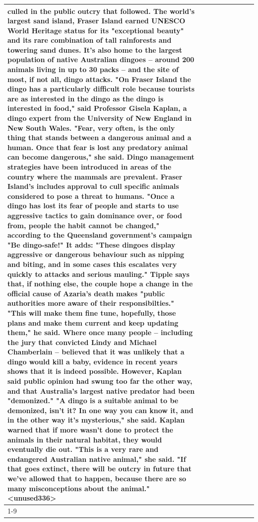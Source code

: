\begin{table}[H]
\begin{tabular}{lllrlllll}
culled in the public outcry that followed. The world's largest sand island, Fraser Island earned UNESCO World Heritage status for its "exceptional beauty" and its rare combination of tall rainforests and towering sand dunes. It's also home to the largest population of native Australian dingoes -- around 200 animals living in up to 30 packs -- and the site of most, if not all, dingo attacks. "On Fraser Island the dingo has a particularly difficult role because tourists are as interested in the dingo as the dingo is interested in food," said Professor Gisela Kaplan, a dingo expert from the University of New England in New South Wales. "Fear, very often, is the only thing that stands between a dangerous animal and a human. Once that fear is lost any predatory animal can become dangerous," she said. Dingo management strategies have been introduced in areas of the country where the mammals are prevalent. Fraser Island's includes approval to cull specific animals considered to pose a threat to humans. "Once a dingo has lost its fear of people and starts to use aggressive tactics to gain dominance over, or food from, people the habit cannot be changed," according to the Queensland government's campaign "Be dingo-safe!" It adds: "These dingoes display aggressive or dangerous behaviour such as nipping and biting, and in some cases this escalates very quickly to attacks and serious mauling." Tipple says that, if nothing else, the couple hope a change in the official cause of Azaria's death makes "public authorities more aware of their responsibilties." "This will make them fine tune, hopefully, those plans and make them current and keep updating them," he said. Where once many people -- including the jury that convicted Lindy and Michael Chamberlain -- believed that it was unlikely that a dingo would kill a baby, evidence in recent years shows that it is indeed possible. However, Kaplan said public opinion had swung too far the other way, and that Australia's largest native predator had been "demonized." "A dingo is a suitable animal to be demonized, isn't it? In one way you can know it, and in the other way it's mysterious," she said. Kaplan warned that if more wasn't done to protect the animals in their natural habitat, they would eventually die out. "This is a very rare and endangered Australian native animal," she said. "If that goes extinct, there will be outcry in future that we've allowed that to happen, because there are so many misconceptions about the animal."<unused336> \\
\cline{1-9}

\end{tabular}
\end{table}
